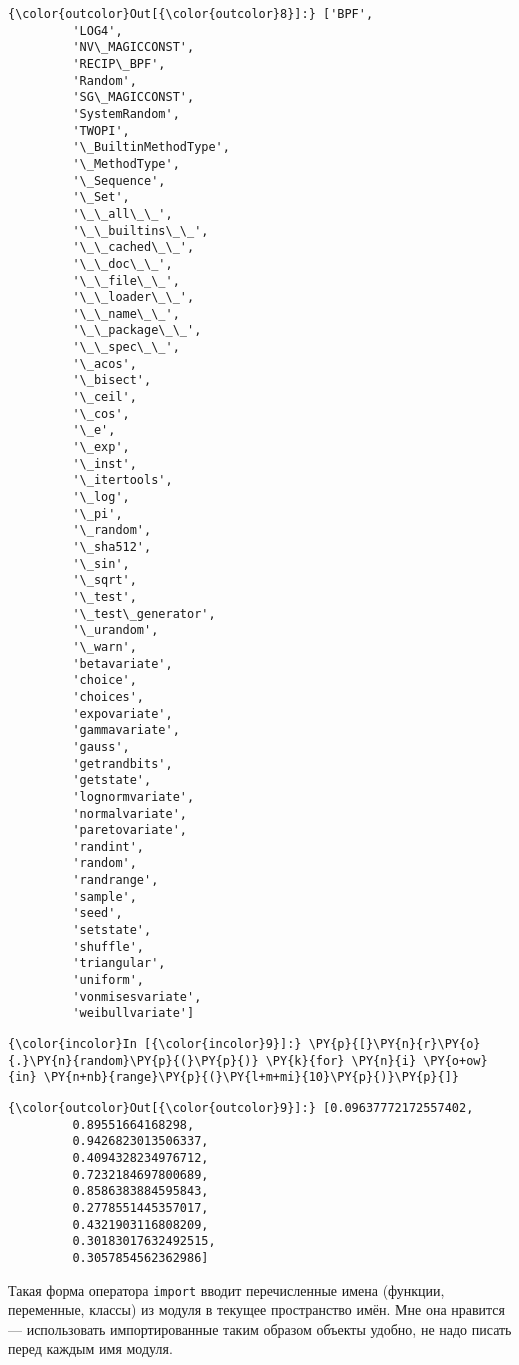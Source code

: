             \begin{Verbatim}[commandchars=\\\{\}]
{\color{outcolor}Out[{\color{outcolor}8}]:} ['BPF',
         'LOG4',
         'NV\_MAGICCONST',
         'RECIP\_BPF',
         'Random',
         'SG\_MAGICCONST',
         'SystemRandom',
         'TWOPI',
         '\_BuiltinMethodType',
         '\_MethodType',
         '\_Sequence',
         '\_Set',
         '\_\_all\_\_',
         '\_\_builtins\_\_',
         '\_\_cached\_\_',
         '\_\_doc\_\_',
         '\_\_file\_\_',
         '\_\_loader\_\_',
         '\_\_name\_\_',
         '\_\_package\_\_',
         '\_\_spec\_\_',
         '\_acos',
         '\_bisect',
         '\_ceil',
         '\_cos',
         '\_e',
         '\_exp',
         '\_inst',
         '\_itertools',
         '\_log',
         '\_pi',
         '\_random',
         '\_sha512',
         '\_sin',
         '\_sqrt',
         '\_test',
         '\_test\_generator',
         '\_urandom',
         '\_warn',
         'betavariate',
         'choice',
         'choices',
         'expovariate',
         'gammavariate',
         'gauss',
         'getrandbits',
         'getstate',
         'lognormvariate',
         'normalvariate',
         'paretovariate',
         'randint',
         'random',
         'randrange',
         'sample',
         'seed',
         'setstate',
         'shuffle',
         'triangular',
         'uniform',
         'vonmisesvariate',
         'weibullvariate']
\end{Verbatim}
        
    \begin{Verbatim}[commandchars=\\\{\}]
{\color{incolor}In [{\color{incolor}9}]:} \PY{p}{[}\PY{n}{r}\PY{o}{.}\PY{n}{random}\PY{p}{(}\PY{p}{)} \PY{k}{for} \PY{n}{i} \PY{o+ow}{in} \PY{n+nb}{range}\PY{p}{(}\PY{l+m+mi}{10}\PY{p}{)}\PY{p}{]}
\end{Verbatim}

            \begin{Verbatim}[commandchars=\\\{\}]
{\color{outcolor}Out[{\color{outcolor}9}]:} [0.09637772172557402,
         0.89551664168298,
         0.9426823013506337,
         0.4094328234976712,
         0.7232184697800689,
         0.8586383884595843,
         0.2778551445357017,
         0.4321903116808209,
         0.30183017632492515,
         0.3057854562362986]
\end{Verbatim}
        
    Такая форма оператора \texttt{import} вводит перечисленные имена
(функции, переменные, классы) из модуля в текущее пространство имён. Мне
она нравится --- использовать импортированные таким образом объекты
удобно, не надо писать перед каждым имя модуля.

